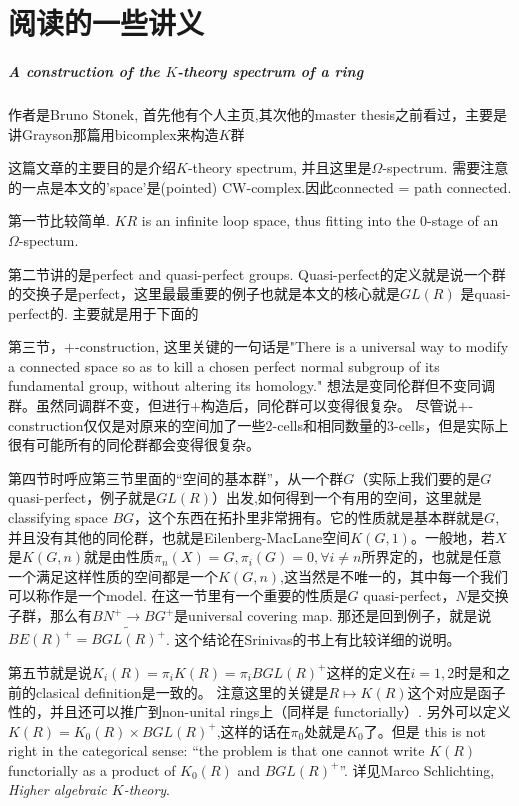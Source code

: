 
\chapter{阅读的一些讲义} %
\label{cha:readnotes}
\paragraph{A construction of the $K$-theory spectrum of a ring} %
\label{par:a_construction_of_the_}
作者是Bruno Stonek, 首先他有个人主页\href{bruno.stonek.com},其次他的master thesis之前看过，主要是讲Grayson那篇用bicomplex来构造$K$群

这篇文章的主要目的是介绍$K$-theory spectrum, 并且这里是$\Omega$-spectrum. 需要注意的一点是本文的'space'是(pointed) CW-complex.因此connected = path connected.

第一节比较简单. $KR$ is an infinite loop space, thus fitting into the $0$-stage of an $\Omega$-spectum.

第二节讲的是perfect and quasi-perfect groups. Quasi-perfect的定义就是说一个群的交换子是perfect，这里最最重要的例子也就是本文的核心就是$GL(R)$ 是quasi-perfect的. 主要就是用于下面的

第三节，$+$-construction, 这里关键的一句话是"There is a universal way to {\color{red}modify} a connected space so as to kill a chosen perfect normal subgroup of its fundamental group, without altering its homology." 想法是变同伦群但不变同调群。虽然同调群不变，但进行$+$构造后，同伦群可以变得很复杂。 尽管说$+$-construction仅仅是对原来的空间加了一些$2$-cells和相同数量的$3$-cells，但是实际上很有可能所有的同伦群都会变得很复杂。

第四节时呼应第三节里面的“空间的基本群”，从一个群$G$（实际上我们要的是$G$ quasi-perfect，例子就是$GL(R)$）出发,如何得到一个有用的空间，这里就是classifying space $BG$，这个东西在拓扑里非常拥有。它的性质就是基本群就是$G$,并且没有其他的同伦群，也就是Eilenberg-MacLane空间$K(G,1)$。一般地，若$X$是$K(G,n)$就是由性质$\pi_n(X)=G,\pi_i(G)=0, \forall i\neq n$所界定的，也就是任意一个满足这样性质的空间都是一个$K(G,n)$,这当然是不唯一的，其中每一个我们可以称作是一个model. 在这一节里有一个重要的性质是$G$ quasi-perfect，$N$是交换子群，那么有$BN^+ \longrightarrow BG^+$是universal covering map. 那还是回到例子，就是说$BE(R)^+=\widetilde{BGL(R)^+}$. 这个结论在Srinivas的书上有比较详细的说明。

第五节就是说$K_i(R)=\pi_i K(R)=\pi_i BGL(R)^+$这样的定义在$i=1,2$时是和之前的clasical definition是一致的。
注意这里的关键是$R\mapsto K(R)$这个对应是函子性的，并且还可以推广到non-unital rings上（同样是 functorially）.
另外可以定义$K(R)=K_0(R)\times BGL(R)^+$,这样的话在$\pi_0$处就是$K_0$了。但是 this is not right in the categorical sense: ``the problem is that one cannot write $K(R)$ functorially as a product of $K_0(R)$ and $BGL	(R)^+$''. 详见Marco Schlichting, {\em Higher algebraic $K$-theory}.

